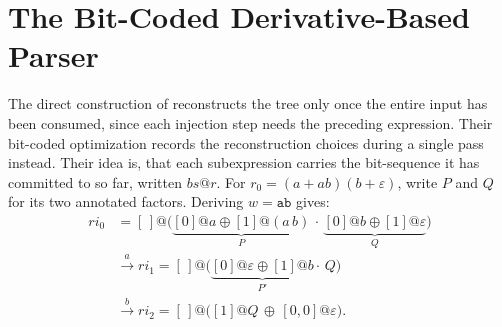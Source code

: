 \section{The Bit-Coded Derivative-Based Parser}
\label{sec:bitcoded-construction-formal}

The direct construction of \citep[pp.~7--8]{sulzmannlu2014} reconstructs the tree
only once the entire input has been consumed,
since each injection step needs the preceding expression.
Their bit-coded optimization records 
the reconstruction choices during a single pass instead.
Their idea is, that each subexpression carries 
the bit-sequence it has committed to so far, written $bs@r$. 
For $r_0=(a+ab)(b+\varepsilon)$, write $P$ and $Q$ 
for its two annotated factors. 
Deriving $w = \mathtt{ab}$ gives:
\begin{equation}\label{eq:bitcoded-overview-example}
\begin{aligned}
\mathit{ri}_0 &= [\,]@\Big(\underbrace{[0]@a \oplus [1]@(a\,b)}_{P}
                 \,\cdot\, \underbrace{[0]@b \oplus [1]@\varepsilon}_{Q}\Big) \\[2pt]
  &\xrightarrow{\ a\ }
    \mathit{ri}_1 = [\,]@\big(\underbrace{[0]@\varepsilon \oplus [1]@b}_{P'} \cdot\, Q\big) \\[2pt]
  &\xrightarrow{\ b\ }
    \mathit{ri}_2 = [\,]@\big([1]@Q \,\oplus\, [0,0]@\varepsilon\big).
\end{aligned}
\end{equation}

